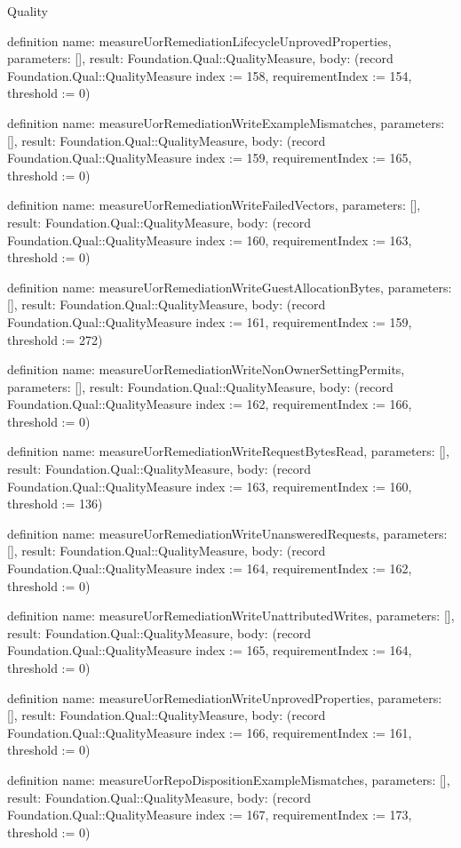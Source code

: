\begin{lexlean}{Quality}
\begin{semanticmodule}
definition{
  name: measureUorRemediationLifecycleUnprovedProperties,
  parameters: [],
  result: Foundation.Qual::QualityMeasure,
  body: (record Foundation.Qual::QualityMeasure {index := 158, requirementIndex := 154, threshold := 0})
}

definition{
  name: measureUorRemediationWriteExampleMismatches,
  parameters: [],
  result: Foundation.Qual::QualityMeasure,
  body: (record Foundation.Qual::QualityMeasure {index := 159, requirementIndex := 165, threshold := 0})
}

definition{
  name: measureUorRemediationWriteFailedVectors,
  parameters: [],
  result: Foundation.Qual::QualityMeasure,
  body: (record Foundation.Qual::QualityMeasure {index := 160, requirementIndex := 163, threshold := 0})
}

definition{
  name: measureUorRemediationWriteGuestAllocationBytes,
  parameters: [],
  result: Foundation.Qual::QualityMeasure,
  body: (record Foundation.Qual::QualityMeasure {index := 161, requirementIndex := 159, threshold := 272})
}

definition{
  name: measureUorRemediationWriteNonOwnerSettingPermits,
  parameters: [],
  result: Foundation.Qual::QualityMeasure,
  body: (record Foundation.Qual::QualityMeasure {index := 162, requirementIndex := 166, threshold := 0})
}

definition{
  name: measureUorRemediationWriteRequestBytesRead,
  parameters: [],
  result: Foundation.Qual::QualityMeasure,
  body: (record Foundation.Qual::QualityMeasure {index := 163, requirementIndex := 160, threshold := 136})
}

definition{
  name: measureUorRemediationWriteUnansweredRequests,
  parameters: [],
  result: Foundation.Qual::QualityMeasure,
  body: (record Foundation.Qual::QualityMeasure {index := 164, requirementIndex := 162, threshold := 0})
}

definition{
  name: measureUorRemediationWriteUnattributedWrites,
  parameters: [],
  result: Foundation.Qual::QualityMeasure,
  body: (record Foundation.Qual::QualityMeasure {index := 165, requirementIndex := 164, threshold := 0})
}

definition{
  name: measureUorRemediationWriteUnprovedProperties,
  parameters: [],
  result: Foundation.Qual::QualityMeasure,
  body: (record Foundation.Qual::QualityMeasure {index := 166, requirementIndex := 161, threshold := 0})
}

definition{
  name: measureUorRepoDispositionExampleMismatches,
  parameters: [],
  result: Foundation.Qual::QualityMeasure,
  body: (record Foundation.Qual::QualityMeasure {index := 167, requirementIndex := 173, threshold := 0})
}


\end{semanticmodule}
\end{lexlean}
